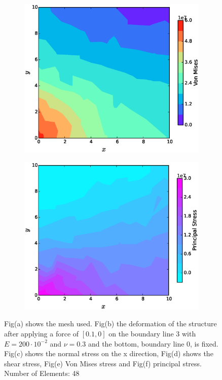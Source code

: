 \documentclass[11pt, a4paper]{article}
\numberwithin{equation}{section}
\begin{document}
\begin{figure}[H]
\begin{subfigure}[H]{0.49\textwidth}
		\caption{}
		\label{fig:1}
	\end{subfigure}
	\begin{subfigure}[H]{0.49\textwidth}
		\includegraphics[width=\textwidth]{fig/ex2_von_mises.eps}
		\caption{}
		\label{fig:2}
	\end{subfigure}
	\begin{subfigure}[H]{0.49\textwidth}
		\includegraphics[width=\textwidth]{fig/ex2_principal_stress.eps}
		\caption{}
		\label{fig:2}
	\end{subfigure}
	\caption{Fig(a) shows the mesh used. Fig(b) the deformation of the structure after applying a force of $[0.1, 0]$ on the boundary line 3 with $E=200 \cdot 10^{-2}$ and $\nu=0.3$ and the bottom, boundary line 0, is fixed. Fig(c) shows the normal stress on the x direction, Fig(d) shows the shear stress, Fig(e) Von Mises stress and Fig(f) principal stress. Number of Elements: 48}
	\label{fig:3_1}
\end{figure}
\end{document}
